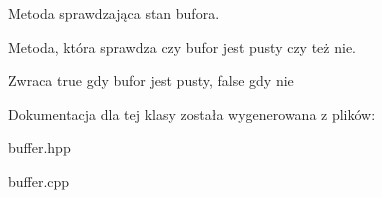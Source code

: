 Metoda sprawdzająca stan bufora. 

Metoda, która sprawdza czy bufor jest pusty czy też nie. \begin{DoxyReturn}{Zwraca}
true gdy bufor jest pusty, false gdy nie 
\end{DoxyReturn}


Dokumentacja dla tej klasy została wygenerowana z plików\+:\begin{DoxyCompactItemize}
\item 
buffer.\+hpp\item 
buffer.\+cpp\end{DoxyCompactItemize}
